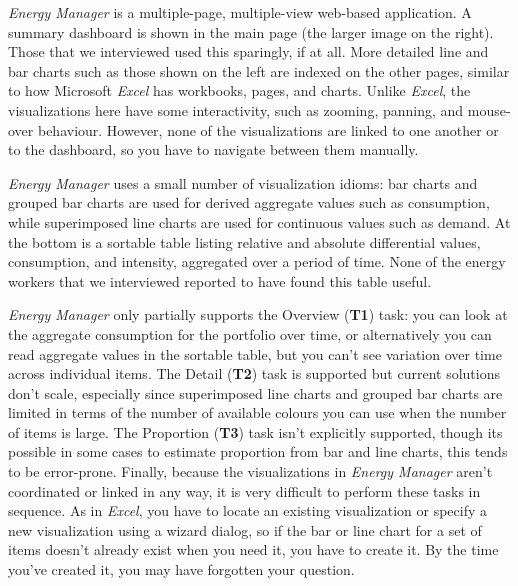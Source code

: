 \documentclass[journal]{vgtc}                %
\newcommand{\bstart}[1]{\vspace{1mm} \noindent{\textbf{#1:}}}
\begin{document}
{\it Energy Manager} is a multiple-page, multiple-view web-based application.
A summary dashboard is shown in the main page (the larger image on the right). 
Those that we interviewed used this sparingly, if at all. 
More detailed line and bar charts such as those shown on the left are indexed on the other pages, similar to how Microsoft {\it Excel} has workbooks, pages, and charts. 
Unlike {\it Excel}, the visualizations here have some interactivity, such as zooming, panning, and mouse-over behaviour. 
However, none of the visualizations are linked to one another or to the dashboard, so you have to navigate between them manually.

\bstart{Analysis} {\it Energy Manager} uses a small number of visualization idioms: bar charts and grouped bar charts are used for derived aggregate values such as consumption, while superimposed line charts are used for continuous values such as demand. 
At the bottom is a sortable table listing relative and absolute differential values, consumption, and intensity, aggregated over a period of time. 
None of the energy workers that we interviewed reported to have found this table useful.

{\it Energy Manager} only partially supports the Overview ({\bf T1}) task: you can look at the aggregate consumption for the portfolio over time, or alternatively you can read aggregate values in the sortable table, but you can't see variation over time across individual items. 
The Detail ({\bf T2}) task is supported but current solutions don't scale, especially since superimposed line charts and grouped bar charts are limited in terms of the number of available colours you can use when the number of items is large. 
The Proportion ({\bf T3}) task isn't explicitly supported, though its possible in some cases to estimate proportion from bar and line charts, this tends to be error-prone.
Finally, because the visualizations in {\it Energy Manager} aren't coordinated or linked in any way, it is very difficult to perform these tasks in sequence. 
As in {\it Excel}, you have to locate an existing visualization or specify a new visualization using a wizard dialog, so if the bar or line chart for a set of items doesn't already exist when you need it, you have to create it. By the time you've created it, you may have forgotten your question.
\end{document}
